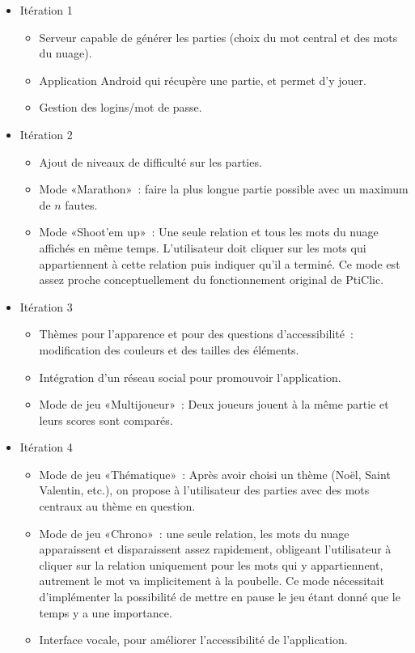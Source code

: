 \documentclass[a4paper,11pt,french]{article}
\def\android{Android\texttrademark{}}
\begin{document}
\begin{itemize}
\item Itération 1
  \begin{itemize}
  \item Serveur capable de générer les parties (choix du mot central et des mots du nuage).
  \item Application \android{} qui récupère une partie, et permet d'y jouer.
  \item Gestion des logins/mot de passe.
  \end{itemize}
\item Itération 2
  \begin{itemize}
  \item Ajout de niveaux de difficulté sur les parties.
  \item Mode «Marathon»~: faire la plus longue partie possible avec un maximum de $n$ fautes.
  \item Mode «Shoot'em up»~: Une seule relation et tous les mots du nuage affichés en même temps. L'utilisateur doit cliquer sur les mots qui appartiennent à cette relation puis indiquer qu'il a terminé. Ce mode est assez proche conceptuellement du fonctionnement original de PtiClic.
  \end{itemize}
\item Itération 3
  \begin{itemize}
  \item Thèmes pour l'apparence et pour des questions d'accessibilité~: modification des couleurs et des tailles des éléments.
  \item Intégration d'un réseau social pour promouvoir l'application.
  \item Mode de jeu «Multijoueur»~: Deux joueurs jouent à la même partie et leurs scores sont comparés.
  \end{itemize}
\item Itération 4
  \begin{itemize}
  \item Mode de jeu «Thématique»~: Après avoir choisi un thème (Noël, Saint Valentin, etc.), on propose à l'utilisateur des parties avec des mots centraux au thème en question.
  \item Mode de jeu «Chrono»~: une seule relation, les mots du nuage apparaissent et disparaissent assez rapidement, obligeant l'utilisateur à cliquer sur la relation uniquement pour les mots qui y appartiennent, autrement le mot va implicitement à la poubelle. Ce mode nécessitait d'implémenter la possibilité de mettre en pause le jeu étant donné que le temps y a une importance.
  \item Interface vocale, pour améliorer l'accessibilité de l'application.
  \end{itemize}
\end{itemize}
\end{document}
